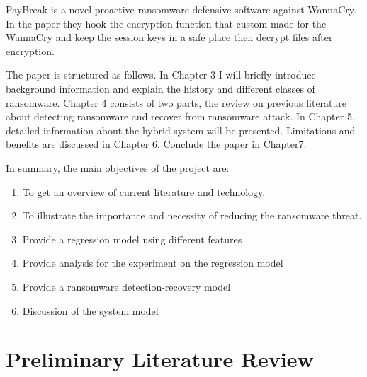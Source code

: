 \documentclass[]{PLR-ShaofengLiu}
\begin{document}
PayBreak is a novel proactive ransomware defensive 
software against WannaCry. In the paper they hook the encryption function 
that custom made for the WannaCry and keep the session keys in a safe 
place then decrypt files after encryption. 

The paper is structured as follows.
In Chapter 3 I will briefly introduce background information and explain the history and different classes of ransomware.
Chapter 4 consists of two parts, the review on previous literature about detecting ransomware and recover from ransomware attack.
In Chapter 5, detailed information about the hybrid system will be presented. Limitations and benefits are discussed in Chapter 6.
Conclude the paper in Chapter7. 

In summary, the main objectives of the project are:
\begin{enumerate}
  \item To get an overview of current literature and technology.
  \item To illustrate the importance and necessity of reducing the ransomware threat.
  \item Provide a regression model using different features
  \item Provide analysis for the experiment on the regression model
  \item Provide a ransomware detection-recovery model
  \item Discussion of the system model
  
\end{enumerate}


\chapter{Preliminary Literature Review}
\end{document}
